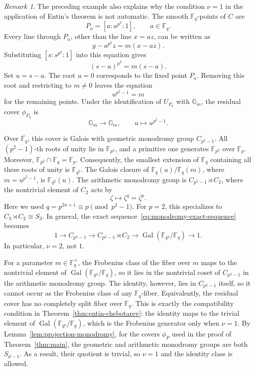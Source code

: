 \documentclass[10pt,a4paper]{amsart}
\theoremstyle{definition}
\theoremstyle{remark}
\newtheorem{remark}[theorem]{Remark}
\newcommand{\bF}{\mathbb{F}}
\newcommand{\Fp}{\mathbb{F}_p}
\newcommand{\Fq}{\mathbb{F}_q}
\begin{document}
\begin{remark}\label{rem:monodromy-obstruction}
The preceding example also explains why the condition $\nu=1$ in the
application of Entin's theorem is not automatic. The smooth $\Fq$-points
of $C$ are
\[
P_a=[a:a^{p^2}:1],
\qquad
a\in\Fq.
\]
Every line through $P_a$, other than the line $x=az$, can be written as
\[
y-a^{p^2}z=m(x-az).
\]
Substituting $[s:s^{p^2}:1]$ into this equation gives
\[
(s-a)^{p^2}=m(s-a).
\]
Set $u=s-a$. The root $u=0$ corresponds to the fixed point $P_a$.
Removing this root and restricting to $m\neq0$ leaves the equation
\[
u^{p^2-1}=m
\]
for the remaining points. Under the identification of $U_{P_a}$ with $\mathbb G_m$, the residual cover $\phi_{P_a}$ is
\[
\mathbb G_m\longrightarrow\mathbb G_m, \qquad u\longmapsto u^{p^2-1}.
\]

Over $\overline{\Fq}$, this cover is Galois with geometric monodromy
group $C_{p^2-1}$. All $(p^2-1)$-th roots of unity lie in
$\bF_{p^2}$, and a primitive one generates $\bF_{p^2}$ over $\Fp$.
Moreover, $\bF_{p^2}\cap\Fq=\Fp$. Consequently, the smallest extension of $\Fq$ containing all these
roots of unity is $\bF_{q^2}$. The Galois closure of
$\Fq(u)/\Fq(m)$, where $m=u^{p^2-1}$, is $\bF_{q^2}(u)$. The arithmetic monodromy group is $C_{p^2-1}\rtimes C_2$, where the nontrivial element of $C_2$ acts by
\[
\zeta\longmapsto\zeta^q=\zeta^p.
\]
Here we used $q=p^{2n+1}\equiv p\pmod{p^2-1}$.
For $p=2$, this specializes to
$C_3\rtimes C_2\cong S_3$. In general, the exact
sequence~\eqref{eq:monodromy-exact-sequence} becomes
\[
1\longrightarrow C_{p^2-1}
\longrightarrow C_{p^2-1}\rtimes C_2
\longrightarrow \operatorname{Gal}(\bF_{q^2}/\Fq)
\longrightarrow 1.
\]
In particular, $\nu=2$, not $1$.

For a parameter $m\in\Fq^\times$, the Frobenius class of the fiber over $m$ maps to the nontrivial element of
$\operatorname{Gal}(\bF_{q^2}/\Fq)$, so it lies in the nontrivial coset of $C_{p^2-1}$ in the arithmetic monodromy group. The identity, however, lies in $C_{p^2-1}$ itself, so it cannot occur as the Frobenius class of any $\Fq$-fiber. Equivalently, the residual cover has no completely split fiber over $\Fq$. This is exactly the compatibility condition in Theorem~\ref{thm:entin-chebotarev}: the identity maps to the trivial element of $\operatorname{Gal}(\bF_{q^\nu}/\Fq)$, which is the Frobenius generator only when $\nu=1$. By
Lemma~\ref{lem:projection-monodromy}, for the covers $\phi_P$ used in the proof of Theorem~\ref{thm:main}, the geometric and arithmetic monodromy groups are both $S_{d-1}$. As a result, their quotient is trivial, so $\nu=1$ and the identity class is allowed.
\end{remark}
\end{document}

